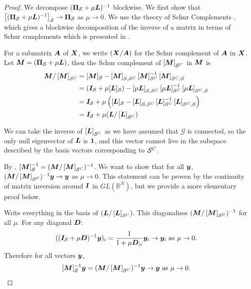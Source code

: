 \begin{proof}
We decompose $(\proj{S} + \mu\matr{L})^{-1}$ blockwise. We first show that $\msubgen[\set{S}]{(\proj{S} + \mu\matr{L})^{-1}} \to \proj{S}$ as $\mu \to 0$. We use the theory of Schur Complements \cite[Section 0.8.5]{horn-and-johnson}, which gives a blockwise decomposition of the inverse of a matrix in terms of Schur complements which is presented in \cite[(0.7.3.1)]{horn-and-johnson}.

For a submatrix $\bm{A}$ of $\bm{X}$, we write $(\bm{X} / \bm{A})$ for the Schur complement of $\bm{A}$ in $\bm{X}$.
Let $\matr{M} = (\proj{S} + \mu\matr{L})$, then the Schur complement of $\msubgen[\set{S}^{C}]{\matr{M}}$ in $\bm{M}$ is
\begin{align}
    \matr{M} / \msubgen[\set{S}^{C}]{\matr{M}} &= \matrsub[S]{M} - \msubgen[\set{S},\set{S}^{C}]{\matr{M}}\msubgen[\set{S}^{C}]{\matr{M}}^{-1}\msubgen[\set{S}^{C},\set{S}]{\matr{M}}
    \\ &= (\matr{I}_{\set{S}} + \mu\matrsub[S]{L}) - \msubgen[\set{S},\set{S}^{C}]{\mu\matr{L}} \msubgen[\set{S}^{C}]{\mu\matr{L}}^{-1} \msubgen[\set{S}^{C},\set{S}]{\mu\matr{L}} \\
    &= \matr{I}_{\set{S}} + \mu\left(\matrsub[S]{L} - \msubgen[\set{S},\set{S}^{C}]{\matr{L}} \msubgen[\set{S}^{C}]{\matr{L}}^{-1} \msubgen[\set{S}^{C},\set{S}]{\matr{L}}  \right) \\
    &= \matr{I}_{\set{S}} + \mu(\matr{L} / \msubgen[\set{S}^{C}]{\matr{L}})
\end{align}

We can take the inverse of $\msubgen[\set{S}^{C}]{\matr{L}}$ as we have assumed that $\mathcal{G}$ is connected, so the only null eigenvector of $\bm{L}$ is $\bm{1}$, and this vector cannot live in the subspace described by the basis vectors corresponding to $\mathcal{S}^{C}$.

By \cite[(0.7.3.1)]{horn-and-johnson}, $\matrsub[S]{\matr{M}}^{-1} = (\matr{M} / \msubgen[\set{S}^{C}]{\matr{M}})^{-1}$. We want to show that for all $\bm{y}$, $(\matr{M} / \msubgen[\set{S}^{C}]{\matr{M}})^{-1}\vect{y} \to \vect{y}$ as $\mu \to 0$. This statement can be proven by the continuity of matrix inversion around $\bm{I}$ in $GL(\mathbb{R}^{N})$, but we provide a more elementary proof below.

Write everything in the basis of $(\matr{L} / \msubgen[\set{S}^{C}]{\matr{L}})$. This diagonalises $(\matr{M} / \msubgen[\set{S}^{C}]{\matr{M}})^{-1}$ for all $\mu$. For any diagonal $\bm{D}$:
\begin{align}
    ((\bm{I}_{\mathcal{S}} + \mu\bm{D})^{-1}\bm{y})_{i} = \frac{1}{1 + \mu \bm{D}_{ii}}\bm{y}_{i} \to \bm{y}_{i} \text{ as }\mu \to 0.
\end{align}
Therefore for all vectors $\bm{y}$, 
\begin{equation}
\label{app:eq:schur_complement_limit}
 \matrsub[S]{\matr{M}}^{-1}\vect{y} = (\matr{M} / \msubgen[\set{S}^{C}]{\matr{M}})^{-1}\vect{y} \to \vect{y} \text{ as } \mu \to 0.    
\end{equation}



\end{proof}
